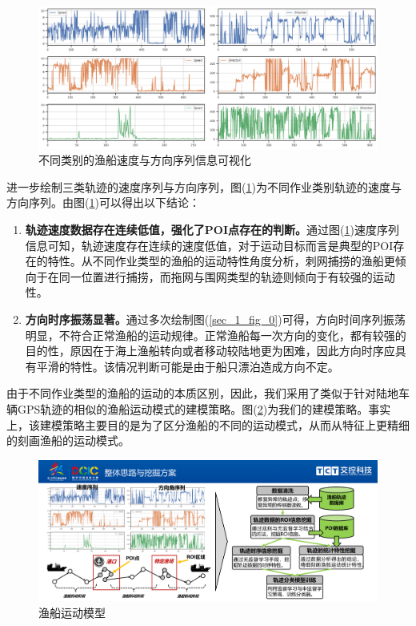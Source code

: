 \documentclass[UTF8, 12pt]{ctexart}
\begin{document}
	\begin{figure}[H]
		\centering
		\includegraphics[width=0.75\linewidth]{..//plots//traj_randomly_3_traj_speed_direction.png}
		\caption{不同类别的渔船速度与方向序列信息可视化}
		\label{sec_1_fig_2}
		\vspace{-0.2cm}
	\end{figure}
	进一步绘制三类轨迹的速度序列与方向序列，图(\ref{sec_1_fig_2})为不同作业类别轨迹的速度与方向序列。由图(\ref{sec_1_fig_2})可以得出以下结论：
	\begin{enumerate}
		\item \textbf{轨迹速度数据存在连续低值，强化了POI点存在的判断。}通过图(\ref{sec_1_fig_2})速度序列信息可知，轨迹速度存在连续的速度低值，对于运动目标而言是典型的POI存在的特性。从不同作业类型的渔船的运动特性角度分析，刺网捕捞的渔船更倾向于在同一位置进行捕捞，而拖网与围网类型的轨迹则倾向于有较强的运动性。
		\item \textbf{方向时序振荡显著。}通过多次绘制图(\ref{sec_1_fig_0})可得，方向时间序列振荡明显，不符合正常渔船的运动规律。正常渔船每一次方向的变化，都有较强的目的性，原因在于海上渔船转向或者移动较陆地更为困难，因此方向时序应具有平滑的特性。该情况判断可能是由于船只漂泊造成方向不定。
	\end{enumerate}

	由于不同作业类型的渔船的运动的本质区别，因此，我们采用了类似于针对陆地车辆GPS轨迹的相似的渔船运动模式的建模策略。图(\ref{sec_1_moving_models})为我们的建模策略。事实上，该建模策略主要目的是为了区分渔船的不同的运动模式，从而从特征上更精细的刻画渔船的运动模式。
	\begin{figure}[H]
		\centering
		\includegraphics[width=0.75\linewidth]{..//plots//boat_moving_model.pdf}
		\caption{渔船运动模型}
		\label{sec_1_moving_models}
		\vspace{-0.2cm}
	\end{figure}
\end{document}
